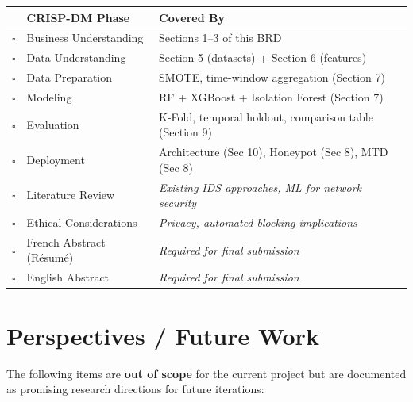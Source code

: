 \documentclass[12pt,a4paper]{article}
\begin{document}
\begin{table}[h!]
\centering
\small
\begin{tabular}{C{0.8cm} L{5cm} L{8cm}}
  \toprule
  & \textbf{CRISP-DM Phase} & \textbf{Covered By} \\
  \midrule
  $\square$ & Business Understanding        & Sections 1--3 of this BRD \\
  $\square$ & Data Understanding            & Section 5 (datasets) + Section 6 (features) \\
  $\square$ & Data Preparation              & SMOTE, time-window aggregation (Section 7) \\
  $\square$ & Modeling                       & RF + XGBoost + Isolation Forest (Section 7) \\
  $\square$ & Evaluation                    & K-Fold, temporal holdout, comparison table (Section 9) \\
  $\square$ & Deployment                    & Architecture (Sec 10), Honeypot (Sec 8), MTD (Sec 8) \\
  \midrule
  $\square$ & Literature Review             & \textit{Existing IDS approaches, ML for network security} \\
  $\square$ & Ethical Considerations         & \textit{Privacy, automated blocking implications} \\
  $\square$ & French Abstract (R\'{e}sum\'{e}) & \textit{Required for final submission} \\
  $\square$ & English Abstract              & \textit{Required for final submission} \\
  \bottomrule
\end{tabular}
\end{table}


\section{Perspectives / Future Work}

The following items are \textbf{out of scope} for the current project but are
documented as promising research directions for future iterations:
\end{document}
